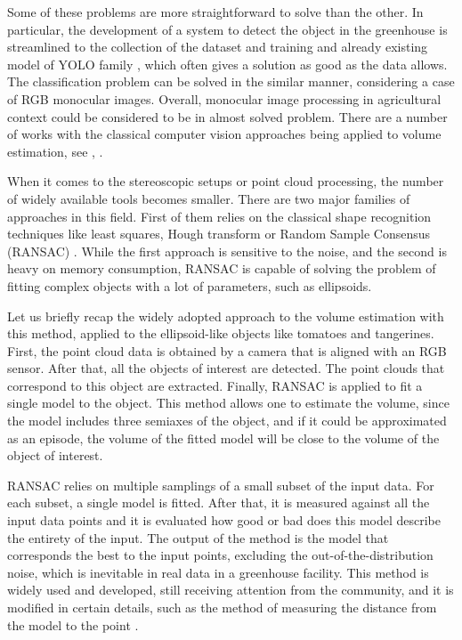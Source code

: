 \begin{thebibliography}{12}
Some of these problems are more straightforward to solve than the other.
In particular, the development of a system to detect the object in the greenhouse is streamlined to the collection of the dataset and training and already existing model of YOLO family \cite{redmon2016you}, which often gives a solution as good as the data allows.
The classification problem can be solved in the similar manner, considering a case of RGB monocular images.
Overall, monocular image processing in agricultural context could be considered to be in almost solved problem.
There are a number of works with the classical computer vision approaches being applied to volume estimation, see \cite{nyalala2019}, \cite{ghahremani2021}.

When it comes to the stereoscopic setups or point cloud processing, the number of widely available tools becomes smaller.
There are two major families of approaches in this field.
First of them relies on the classical shape recognition techniques like least squares, Hough transform or Random Sample Consensus (RANSAC) \cite{fischler1981}.
While the first approach is sensitive to the noise, and the second is heavy on memory consumption, RANSAC is capable of solving the problem of fitting complex objects with a lot of parameters, such as ellipsoids.

Let us briefly recap the widely adopted approach to the volume estimation with this method, applied to the ellipsoid-like objects like tomatoes and tangerines.
First, the point cloud data is obtained by a camera that is aligned with an RGB sensor.
After that, all the objects of interest are detected.
The point clouds that correspond to this object are extracted.
Finally, RANSAC is applied to fit a single model to the object.
This method allows one to estimate the volume, since the model includes three semiaxes of the object, and if it could be approximated as an episode, the volume of the fitted model will be close to the volume of the object of interest.

RANSAC relies on multiple samplings of a small subset of the input data.
For each subset, a single model is fitted.
After that, it is measured against all the input data points and it is evaluated how good or bad does this model describe the entirety of the input.
The output of the method is the model that corresponds the best to the input points, excluding the out-of-the-distribution noise, which is inevitable in real data in a greenhouse facility.
This method is widely used and developed, still receiving attention from the community, and it is modified in certain details, such as the method of measuring the distance from the model to the point \cite{han2023}.


\end{thebibliography}
